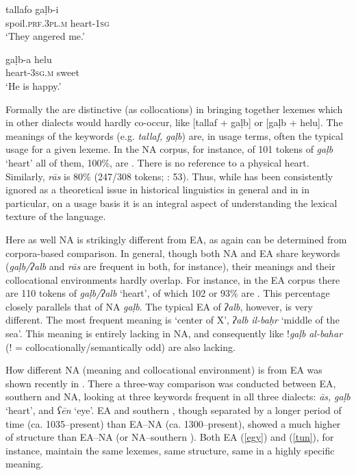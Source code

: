 \documentclass[output=paper]{langsci/langscibook}
\begin{document}
\ea\label{galb}
\ea
\gll tallafo gaḷb-i\\
     spoil.\textsc{prf.3pl.m} heart-1\textsc{sg}\\
\glt ‘They angered me.’

\ex
\gll gaḷb-a helu\\
     heart-\textsc{3sg.m} sweet\\
\glt ‘He is happy.’\label{helu}
\z
\z

Formally the  are distinctive (as  collocations) in bringing together lexemes which in other dialects would hardly co-occur, like [tallaf + gaḷb] or [gaḷb + helu]. The  meanings of the keywords (e.g. \textit{tallaf,} \textit{gaḷb}) are, in usage terms, often the typical usage for a given lexeme. In the NA corpus, for instance, of 101 tokens of \textit{gaḷb} ‘heart’ all of them, 100\%, are . There is no reference to a physical heart. Similarly, \textit{rās} is 80\%  (247/308 tokens; \citealt{Ritt-Benmimounetc2017}: 53). Thus, while  has been consistently ignored as a theoretical issue in historical linguistics in general and in  in particular, on a usage basis it is an integral aspect of understanding the lexical texture of the language.


Here as well NA is strikingly different from EA, as again can be determined from corpora-based comparison. In general, though both NA and EA share  keywords (\textit{gaḷb/ʔalb} and \textit{rās} are frequent in both, for instance), their meanings and their collocational environments hardly overlap. For instance, in the EA corpus there are 110 tokens of \textit{gaḷb/ʔalb} ‘heart’, of which 102 or 93\% are . This percentage closely parallels that of NA  \textit{gaḷb}. The typical EA  of  \textit{ʔalb}, however, is very different. The most frequent meaning is ‘center of X’, \textit{ʔalb} \textit{il-baḥr} ‘middle of the sea’. This meaning is entirely lacking in NA, and consequently  like !\textit{gaḷb} \textit{al-bahar} (! = collocationally/semantically odd) are also lacking.

How different NA  (meaning and collocational environment) is from EA was shown recently in \citet{Ritt-Benmimounetc2017}. There a three-way comparison was conducted between EA, southern   and NA, looking at three  keywords frequent in all three dialects: \textit{{\R}ās,} \textit{gaḷb} ‘heart’, and \textit{ʕēn} ‘eye’. EA and southern , though separated by a longer period of time (ca. 1035–present) than EA–NA (ca. 1300–present), showed a much higher  of  structure than EA–NA (or NA–southern ). Both EA (\ref{egy}) and   (\ref{tun}), for instance, maintain the same lexemes, same structure, same  in a highly specific meaning.
\end{document}
